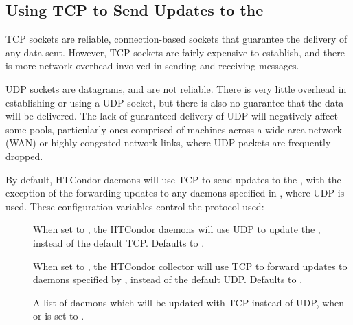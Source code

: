 \subsection{\label{sec:tcp-collector-update}Using TCP to Send Updates to
the }


TCP sockets are reliable, connection-based sockets that guarantee
the delivery of any data sent.
However, TCP sockets are fairly expensive to establish, and there is more
network overhead involved in sending and receiving messages.

UDP sockets are datagrams, and are not reliable.
There is very little overhead in establishing or using a UDP socket,
but there is also no guarantee that the data will be delivered.
The lack of guaranteed delivery of UDP will negatively affect some pools,
particularly ones comprised of machines across a wide area network (WAN)
or highly-congested network links, 
where UDP packets are frequently dropped.

By default, HTCondor daemons will use TCP to send updates to the
, 
with the exception of the  forwarding
updates to any  daemons
specified in ,
where UDP is used.
These configuration variables control the protocol used:

\begin{description}

\item[]
  When set to , the HTCondor daemons will use UDP to
  update the , instead of the default TCP.
  Defaults to .

\item[]
  When set to , the HTCondor collector will use TCP to
  forward updates to  daemons specified 
  by ,
  instead of the default UDP.
  Defaults to .

\item[]
  A list of  daemons which will be updated with TCP 
  instead of UDP,
  when  or
   is set to .

\end{description}


